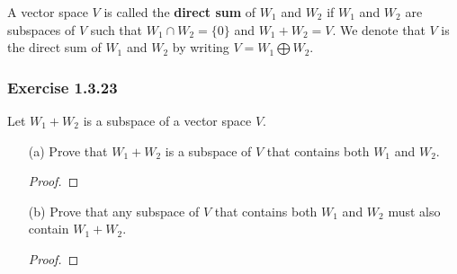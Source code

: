 \begin{definition}
    A vector space \( V  \) is called the \textbf{direct sum} of \( W_{1}  \) and \( W_{2}  \) if \( W_{1}  \) and \( W_{2}  \) are subspaces of \( V  \) such that \( W_{1} \cap W_{2} = \{ 0  \}  \) and \( W_{1} + W_{2} = V  \). We denote that \( V  \) is the direct sum of \( W_{1}  \) and \( W_{2}  \) by writing \( V = W_{1} \bigoplus W_{2} \).
\end{definition}
 
\subsubsection{Exercise 1.3.23} Let \( W_{1} + W_{2}  \) is a subspace of a vector space \( V  \).
\begin{enumerate}
    \item[(a)] Prove that \( W_{1} + W_{2}  \) is a subspace of \( V  \) that contains both \( W_{1}  \) and \( W_{2}  \).
        \begin{proof}
        
        \end{proof}
    \item[(b)] Prove that any subspace of \( V  \) that contains both \( W_{1}  \) and \( W_{2}  \) must also contain \( W_{1} + W_{2} \).
        \begin{proof}
        
        \end{proof}
\end{enumerate}




